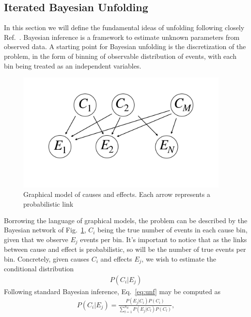 \subsection{Iterated Bayesian Unfolding}
In this section we will define the fundamental ideas of unfolding following closely Ref.~\cite{DAgostini:1994fjx, dagostini2010improved}.
Bayesian inference is a framework to estimate unknown parameters from observed data. A starting point for Bayesian unfolding is the discretization of the problem, in the form of binning of observable distribution of events, with each bin being treated as an independent variables.
%
\begin{figure}[t]
\centering
\includegraphics[page = 1, width=0.95\textwidth]{./figures/graphical_model}
\caption{Graphical model of causes and effects. Each arrow represents a probabilistic link}
\label{fig:graph_model}
\end{figure}
%
Borrowing the language of graphical models, the problem can be described by the Bayesian network of Fig.~\ref{fig:graph_model}, $C_{i}$ being the true number of events in each cause bin, given that we observe $E_{j}$ events per bin.
It's important to notice that as the links between cause and effect is probabilistic, so will be the number of true events per bin. Concretely,  given causes $C_i$ and effects $E_j$, we wish to estimate the conditional distribution
%
\begin{align}\label{eq:unf}
P(C_i | E_j)
\end{align}
%
Following standard Bayesian inference, Eq.~\ref{eq:unf} may be computed as
%
\begin{align}\label{eq:bayes_inf}
P(C_i | E_j) = \frac{P(E_j | C_i) P(C_i)}{\sum_{l=1}^{n_E} P(E_j| C_l) P(C_l)},
\end{align}
